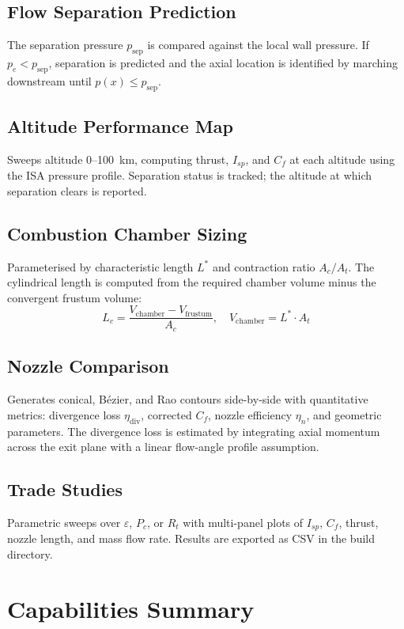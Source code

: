 \documentclass[11pt,a4paper]{article}
\begin{document}
\subsection{Flow Separation Prediction}
The separation pressure $p_{\text{sep}}$ is compared against the local wall pressure. If $p_e < p_{\text{sep}}$, separation is predicted and the axial location is identified by marching downstream until $p(x) \leq p_{\text{sep}}$.

\subsection{Altitude Performance Map}
Sweeps altitude 0--100~km, computing thrust, $I_{sp}$, and $C_f$ at each altitude using the ISA pressure profile. Separation status is tracked; the altitude at which separation clears is reported.

\subsection{Combustion Chamber Sizing}
Parameterised by characteristic length $L^*$ and contraction ratio $A_c/A_t$. The cylindrical length is computed from the required chamber volume minus the convergent frustum volume:
\begin{equation}
L_c = \frac{V_{\text{chamber}} - V_{\text{frustum}}}{A_c}, \quad V_{\text{chamber}} = L^*\cdot A_t
\end{equation}

\subsection{Nozzle Comparison}
Generates conical, B\'ezier, and Rao contours side-by-side with quantitative metrics: divergence loss $\eta_{\text{div}}$, corrected $C_f$, nozzle efficiency $\eta_n$, and geometric parameters. The divergence loss is estimated by integrating axial momentum across the exit plane with a linear flow-angle profile assumption.

\subsection{Trade Studies}
Parametric sweeps over $\varepsilon$, $P_c$, or $R_t$ with multi-panel plots of $I_{sp}$, $C_f$, thrust, nozzle length, and mass flow rate. Results are exported as CSV in the build directory.

\section{Capabilities Summary}
\end{document}
